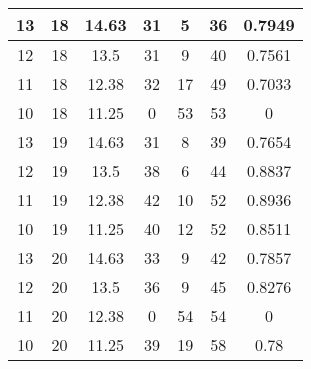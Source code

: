 \documentclass[letterpaper, 12pt]{article}
\begin{document}
\begin{longtable}{|c|c|c|c|c|c|c|}
\hline
13 & 18 & 14.63 & 31 & 5 & 36 & 0.7949 \\
\hline
12 & 18 & 13.5 & 31 & 9 & 40 & 0.7561 \\
\hline
11 & 18 & 12.38 & 32 & 17 & 49 & 0.7033 \\
\hline
10 & 18 & 11.25 & 0 & 53 & 53 & 0 \\
\hline
13 & 19 & 14.63 & 31 & 8 & 39 & 0.7654 \\
\hline
12 & 19 & 13.5 & 38 & 6 & 44 & 0.8837 \\
\hline
11 & 19 & 12.38 & 42 & 10 & 52 & 0.8936 \\
\hline
10 & 19 & 11.25 & 40 & 12 & 52 & 0.8511 \\
\hline
13 & 20 & 14.63 & 33 & 9 & 42 & 0.7857 \\
\hline
12 & 20 & 13.5 & 36 & 9 & 45 & 0.8276 \\
\hline
11 & 20 & 12.38 & 0 & 54 & 54 & 0 \\
\hline
10 & 20 & 11.25 & 39 & 19 & 58 & 0.78 \\
\hline
\end{longtable}
\end{document}
